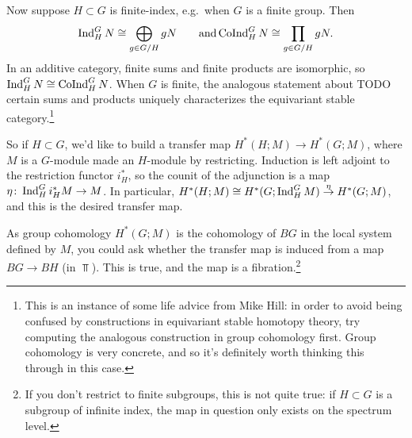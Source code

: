 Now suppose $H\subset G$ is finite-index, e.g.\ when $G$ is a finite group. Then
\[\operatorname{Ind}_H^G N\cong\bigoplus_{g\in G/H} gN\qquad\text{and} \operatorname{CoInd}_H^G N\cong\prod_{g\in G/H} gN.\]
In an additive category, finite sums and finite products are isomorphic, so $\operatorname{Ind}_H^GN\cong\operatorname{CoInd}_H^G N$. When $G$
is finite, the analogous statement about {\color{red}TODO} certain sums and products uniquely characterizes the
equivariant stable category.\footnote{This is an instance of some life advice from Mike Hill: in order to avoid
being confused by constructions in equivariant stable homotopy theory, try computing the analogous construction in
group cohomology first. Group cohomology is very concrete, and so it's definitely worth thinking this through in
this case.}

So if $H\subset G$, we'd like to build a transfer map $H^*(H;M)\to H^*(G;M)$, where $M$ is a $G$-module made an
$H$-module by restricting. Induction is left adjoint to the restriction functor $i_H^*$, so the counit of the
adjunction is a map $\eta\colon\operatorname{Ind}_H^G i_H^*M\to M$. In particular, $H^*(H;M)\cong H^*(G;\operatorname{Ind}_H^G
M)\stackrel\eta\to H^*(G;M)$, and this is the desired transfer map.

As group cohomology $H^*(G;M)$ is the cohomology of $BG$ in the local system defined by $M$, you could ask whether
the transfer map is induced from a map $BG\to BH$ (in $\Top$). This is true, and the map is a
fibration.\footnote{If you don't restrict to finite subgroups, this is not quite true: if $H\subset G$ is a
subgroup of infinite index, the map in question only exists on the spectrum level.}
